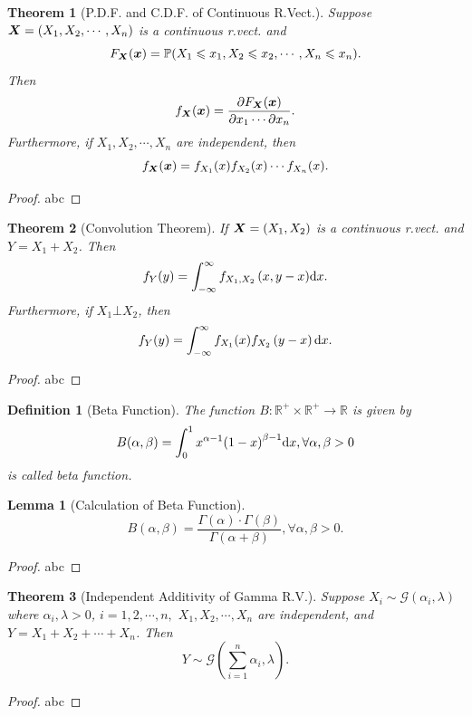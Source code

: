 \documentclass[openany,12pt]{book}
\newtheorem{theorem}{Theorem}[chapter]
\newtheorem{lemma}{Lemma}[chapter]
\newtheorem{definition}{Definition}[chapter]
\begin{document}
\begin{theorem}[P.D.F. and C.D.F. of Continuous R.Vect.]
  Suppose $\bm{X}=(X_1, X_2, \cdots,X_n)$ is a continuous r.vect. and
  $$
    F_{\bm{X}}(\bm{x})=\mathbb{P}(X_1\leqslant x_1,X_2\leqslant x_2, \cdots,X_n\leqslant x_n).
  $$
  Then
  $$
    f_{\bm{X}}(\bm{x})=\frac{\partial F_{\bm{X}}(\bm{x})}{\partial x_1\cdots\partial x_n}.
  $$
  Furthermore, if $X_1, X_2, \cdots,X_n$ are independent, then
  $$
    f_{\bm{X}}(\bm{x})=f_{X_1}(x)f_{X_2}(x)\cdots f_{X_n}(x).
  $$
\end{theorem}

\begin{proof}
  abc
\end{proof}

\begin{theorem}[Convolution Theorem]
  If $\bm{X}=(X_1,X_2)$ is a continuous r.vect. and $Y=X_1+X_2$. Then
  $$
    f_Y(y)=\int_{-\infty}^{\infty}{f_{X_1,X_2}\left(x,y-x\right)}\mathrm{d} x.
  $$
  Furthermore, if $X_1\bot X_2$, then
  $$
    f_Y(y)=\int_{-\infty}^{\infty}{f_{X_1}(x)}f_{X_2}\left(y-x\right)\mathrm{d} x.
  $$
\end{theorem}

\begin{proof}
  abc
\end{proof}

\begin{definition}[Beta Function]
  The function $B: \mathbb{R}^+\times\mathbb{R}^+\to\mathbb{R}$ is given by
  $$
    B(\alpha,\beta)=\int_{0}^{1}x^{\alpha-1}{(1-x)}^{\beta-1}\mathrm{d} x, \forall\alpha,\beta>0
  $$
  is called beta function.
\end{definition}

\begin{lemma}[Calculation of Beta Function]
  \[B(\alpha,\beta)= \frac{\Gamma( \alpha) \cdot \Gamma( \beta)}{\Gamma( \alpha + \beta)}, \forall\alpha,\beta > 0.\]
\end{lemma}

\begin{proof}
  abc
\end{proof}

\begin{theorem}[Independent Additivity of Gamma R.V.]
  Suppose $X_i\sim\mathcal{G}(\alpha_i,\lambda)$ where $\alpha_i,\lambda>0$, $i=1,2, \cdots,n,$ ${X}_1, X_2, \cdots,X_n$ are independent, and $Y=X_1+X_2+\cdots+X_n$. Then
  \[Y\sim\mathcal{G}\left( \sum_{i = 1}^{n}\alpha_{i},\lambda \right).\]
\end{theorem}

\begin{proof}
  abc
\end{proof}
\end{document}
